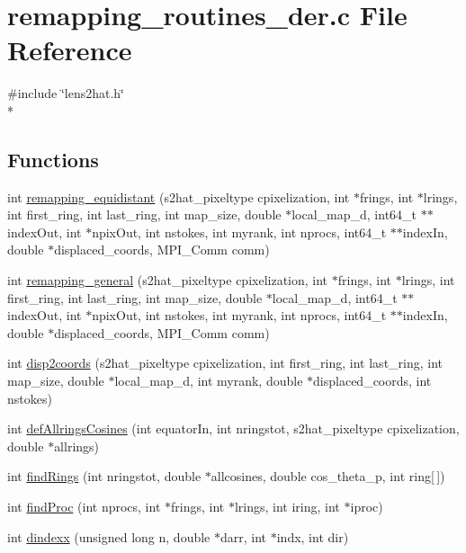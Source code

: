 \section{remapping\-\_\-routines\-\_\-der.\-c File Reference}
\label{rng_2derivatives_2remapping__routines__der_8c}
{\ttfamily \#include \char`\"{}lens2hat.\-h\char`\"{}}\\*
\subsection*{Functions}
\begin{DoxyCompactItemize}
\item 
int \hyperlink{rng_2derivatives_2remapping__routines__der_8c_a62593f0a95155700c13a0f25b7ca0f07}{remapping\-\_\-equidistant} (s2hat\-\_\-pixeltype cpixelization, int $\ast$frings, int $\ast$lrings, int first\-\_\-ring, int last\-\_\-ring, int map\-\_\-size, double $\ast$local\-\_\-map\-\_\-d, int64\-\_\-t $\ast$$\ast$index\-Out, int $\ast$npix\-Out, int nstokes, int myrank, int nprocs, int64\-\_\-t $\ast$$\ast$index\-In, double $\ast$displaced\-\_\-coords, M\-P\-I\-\_\-\-Comm comm)
\item 
int \hyperlink{rng_2derivatives_2remapping__routines__der_8c_a1d7d063047d20b437aaa39cddf5f0f65}{remapping\-\_\-general} (s2hat\-\_\-pixeltype cpixelization, int $\ast$frings, int $\ast$lrings, int first\-\_\-ring, int last\-\_\-ring, int map\-\_\-size, double $\ast$local\-\_\-map\-\_\-d, int64\-\_\-t $\ast$$\ast$index\-Out, int $\ast$npix\-Out, int nstokes, int myrank, int nprocs, int64\-\_\-t $\ast$$\ast$index\-In, double $\ast$displaced\-\_\-coords, M\-P\-I\-\_\-\-Comm comm)
\item 
int \hyperlink{rng_2derivatives_2remapping__routines__der_8c_a8224d455c626532938c1729f5e62daee}{disp2coords} (s2hat\-\_\-pixeltype cpixelization, int first\-\_\-ring, int last\-\_\-ring, int map\-\_\-size, double $\ast$local\-\_\-map\-\_\-d, int myrank, double $\ast$displaced\-\_\-coords, int nstokes)
\item 
int \hyperlink{rng_2derivatives_2remapping__routines__der_8c_af6cfda4741a11339b5a1d9c599411b87}{def\-Allrings\-Cosines} (int equator\-In, int nringstot, s2hat\-\_\-pixeltype cpixelization, double $\ast$allrings)
\item 
int \hyperlink{rng_2derivatives_2remapping__routines__der_8c_a95c082e86d6e644f4789485021f90235}{find\-Rings} (int nringstot, double $\ast$allcosines, double cos\-\_\-theta\-\_\-p, int ring\mbox{[}$\,$\mbox{]})
\item 
int \hyperlink{rng_2derivatives_2remapping__routines__der_8c_af4ba917a5b9f32394911c8d28d6c2d07}{find\-Proc} (int nprocs, int $\ast$frings, int $\ast$lrings, int iring, int $\ast$iproc)
\item 
int \hyperlink{rng_2derivatives_2remapping__routines__der_8c_ad574f0dfca1f8db2b630a9b6cf3a45c9}{dindexx} (unsigned long n, double $\ast$darr, int $\ast$indx, int dir)
\end{DoxyCompactItemize}


